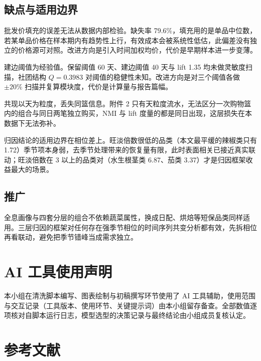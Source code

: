 \documentclass[zihao=-4,a4paper]{ctexart}
\begin{document}
\subsection{缺点与适用边界}

批发价填充的误差无法从数据内部检验。缺失率 79.6\%，填充用的是单品中位数，若某单品价格在样本期内有趋势性上行，有效成本会被系统性低估，此偏差没有独立的价格源可对照。改进方向是引入时间加权均价，代价是早期样本进一步变薄。

建边阈值为经验值。保留阈值 60 天、建边阈值 40 天与 lift 1.35 均未做灵敏度扫描，社团结构 $Q=0.3983$ 对阈值的稳健性未知。改进方向是对三个阈值各做 $\pm 20\%$ 扫描并复算模块度，代价是计算量与报告篇幅。

共现以天为粒度，丢失同篮信息。附件 2 只有天粒度流水，无法区分一次购物篮内的组合与同日两笔独立购买，NMI 与 lift 度量的都是同日出现，这层损失在本数据下无法弥补。

归因结论的适用边界在相位差上。旺淡倍数很低的品类（本文最平缓的辣椒类只有 1.72）季节项本身弱，去季节处理带来的恢复量有限，此时表面相关已接近真实联动；旺淡倍数在 3 以上的品类对（水生根茎类 6.87、茄类 3.37）才是归因框架收益最大的场景。

\subsection{推广}

全息画像与四套分层的组合不依赖蔬菜属性，换成日配、烘焙等短保品类同样适用。三层归因的框架对任何存在强季节相位的时间序列共变分析都有效，先拆相位再看联动，避免把季节错峰当成需求独立。

\section*{AI 工具使用声明}
本小组在清洗脚本编写、图表绘制与初稿撰写环节使用了 AI 工具辅助，使用范围与交互记录（工具版本、使用环节、关键提示词）由本小组留存备查。全部数值逐项核对自脚本运行日志，模型选型的决策记录与最终结论由小组成员复核认定。

\section*{参考文献}

\appendix
\end{document}
